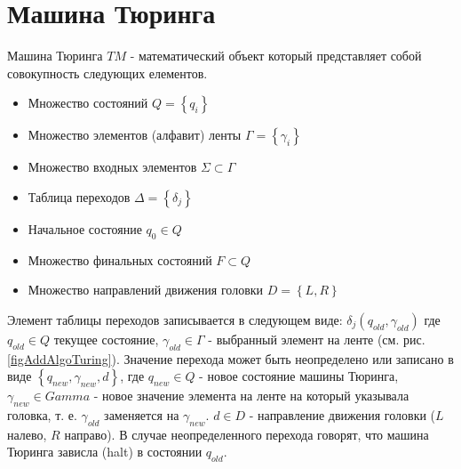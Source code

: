 \section{Машина Тюринга}
\label{addTuring}

Машина Тюринга $TM$ - математический объект который представляет собой
совокупность следующих елементов. 
\begin{itemize}
\item{Множество состояний $Q = \left\{q_i\right\}$}
\item{Множество элементов (алфавит) ленты $\Gamma = \left\{\gamma_i\right\}$}
\item{Множество входных элементов $\Sigma \subset \Gamma$}
\item{Таблица переходов $\Delta = \left\{\delta_j\right\}$}
\item{Начальное состояние $q_0 \in Q$}
\item{Множество финальных состояний $F \subset Q$}
\item{Множество направлений движения головки $D = \left\{L, R\right\}$}
\end{itemize}



Элемент таблицы переходов записывается в следующем виде:
$\delta_j\left(q_{old}, \gamma_{old}\right)$ где $q_{old} \in Q$ текущее состояние,
$\gamma_{old} \in \Gamma$ - выбранный элемент на ленте 
(см. рис. \ref{figAddAlgoTuring}). Значение перехода может быть
неопределено или записано в виде $\left\{q_{new}, \gamma_{new}, d\right\}$, где
  $q_{new} \in Q$ - новое состояние машины Тюринга, $\gamma_{new} \in Gamma$ -
  новое значение элемента на ленте на который указывала головка,
  т. е. $\gamma_{old}$ заменяется на $\gamma_{new}$. $d \in D$ - направление
  движения головки ($L$ налево, $R$ направо). В случае неопределенного
  перехода говорят, что машина Тюринга зависла (halt) в 
  состоянии $q_{old}$.

